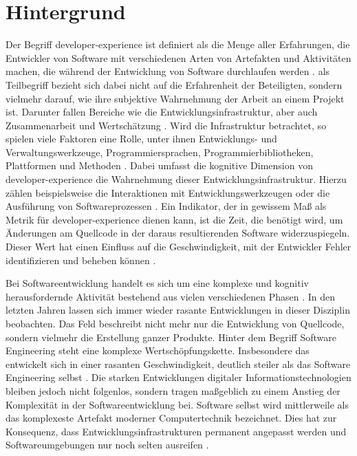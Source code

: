 \section{Hintergrund}
\label{sec:01-01_background}

Der Begriff \Gls{developer-experience} ist definiert als die Menge aller Erfahrungen, die Entwickler von Software mit verschiedenen Arten von Artefakten und Aktivitäten machen, die während der Entwicklung von Software durchlaufen werden \cite{017:Developer-Experience-Concept-and-Definition,100:Developer-Experience-Glueckliche-Entwickler-schreiben-besseren-Code}.  als Teilbegriff bezieht sich dabei nicht auf die Erfahrenheit der Beteiligten, sondern vielmehr darauf, wie ihre subjektive Wahrnehmung der Arbeit an einem Projekt ist. Darunter fallen Bereiche wie die Entwicklungsinfrastruktur, aber auch Zusammenarbeit und Wertschätzung \cite{017:Developer-Experience-Concept-and-Definition}. Wird die Infrastruktur betrachtet, so spielen viele Faktoren eine Rolle, unter ihnen Entwicklungs- und Verwaltungswerkzeuge, Programmiersprachen, Programmierbibliotheken, Plattformen und Methoden \cite{100:Developer-Experience-Glueckliche-Entwickler-schreiben-besseren-Code}. Dabei umfasst die kognitive Dimension von \Gls{developer-experience} die Wahrnehmung dieser Entwicklungsinfrastruktur. Hierzu zählen beispielsweise die Interaktionen mit Entwicklungswerkzeugen oder die Ausführung von Softwareprozessen \cite{017:Developer-Experience-Concept-and-Definition}. Ein Indikator, der in gewissem Maß als Metrik für \Gls{developer-experience} dienen kann, ist die Zeit, die benötigt wird, um Änderungen am Quellcode in der daraus resultierenden Software widerzuspiegeln. Dieser Wert hat einen Einfluss auf die Geschwindigkeit, mit der Entwickler Fehler identifizieren und beheben können \cite{100:Developer-Experience-Glueckliche-Entwickler-schreiben-besseren-Code}.

Bei Softwareentwicklung handelt es sich um eine komplexe und kognitiv herausfordernde Aktivität bestehend aus vielen verschiedenen Phasen \cite{014:Managing-Container-based-Software-Development-Environments}. In den letzten Jahren lassen sich immer wieder rasante Entwicklungen in dieser Disziplin beobachten. Das Feld beschreibt nicht mehr nur die Entwicklung von Quellcode, sondern vielmehr die Erstellung ganzer Produkte. Hinter dem Begriff Software Engineering steht eine komplexe Wertschöpfungskette. Insbesondere das  entwickelt sich in einer rasanten Geschwindigkeit, deutlich steiler als das Software Engineering selbst \cite{026:Some-Trends-in-Web-Application-Development}. Die starken Entwicklungen digitaler Informationstechnologien bleiben jedoch nicht folgenlos, sondern tragen maßgeblich zu einem Anstieg der Komplexität in der Softwareentwicklung bei. Software selbst wird mittlerweile als das komplexeste Artefakt moderner Computertechnik bezeichnet. Dies hat zur Konsequenz, dass Entwicklungsinfrastrukturen permanent angepasst werden und Softwareumgebungen nur noch selten ausreifen \cite{018:Software-Development-Productivity}.

